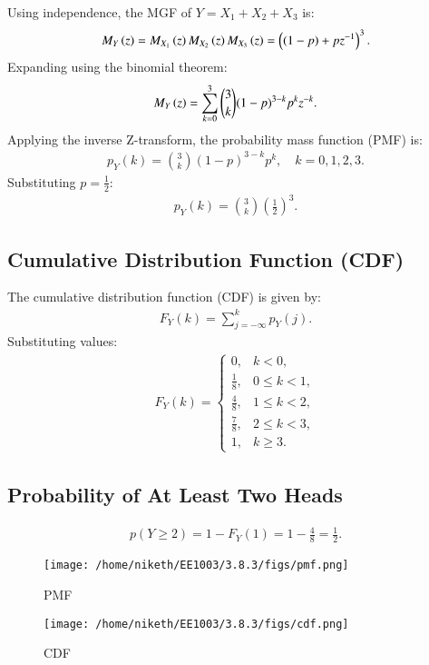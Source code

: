 \documentclass[journal]{IEEEtran}
\begin{document}
Using independence, the MGF of $Y = X_1 + X_2 + X_3$ is:
\begin{align}
M_Y\left(z\right) = M_{X_1}\left(z\right) M_{X_2}\left(z\right) M_{X_3}\left(z\right) = \left((1 - p) + pz^{-1}\right)^3.
\end{align}
Expanding using the binomial theorem:
\begin{align}
M_Y\left(z\right) = \sum_{k=0}^{3} \binom{3}{k} (1 - p)^{3-k} p^k z^{-k}.
\end{align}
Applying the inverse Z-transform, the probability mass function (PMF) is:
\begin{align}
p_Y(k) = \binom{3}{k} (1 - p)^{3-k} p^k, \quad k = 0, 1, 2, 3.
\end{align}
Substituting $p = \frac{1}{2}$:
\begin{align}
p_Y(k) = \binom{3}{k} \left(\frac{1}{2}\right)^3.
\end{align}

\subsection{Cumulative Distribution Function (CDF)}
The cumulative distribution function (CDF) is given by:
\begin{align}
F_Y(k) = \sum_{j=-\infty}^{k} p_Y(j).
\end{align}
Substituting values:
\begin{align}
F_Y(k) =
\begin{cases}
0, & k < 0, \\
\frac{1}{8}, & 0 \leq k < 1, \\
\frac{4}{8}, & 1 \leq k < 2, \\
\frac{7}{8}, & 2 \leq k < 3, \\
1, & k \geq 3.
\end{cases}
\end{align}

\subsection{Probability of At Least Two Heads}
\begin{align}
p(Y \geq 2) = 1 - F_Y(1) = 1 - \frac{4}{8} = \frac{1}{2}.
\end{align}

\begin{figure}[!ht]
    \centering
    \texttt{[image: /home/niketh/EE1003/3.8.3/figs/pmf.png]}
    \caption{PMF}
\end{figure}
\begin{figure}[!ht]
    \centering
    \texttt{[image: /home/niketh/EE1003/3.8.3/figs/cdf.png]}
    \caption{CDF}
\end{figure}
\end{document}
